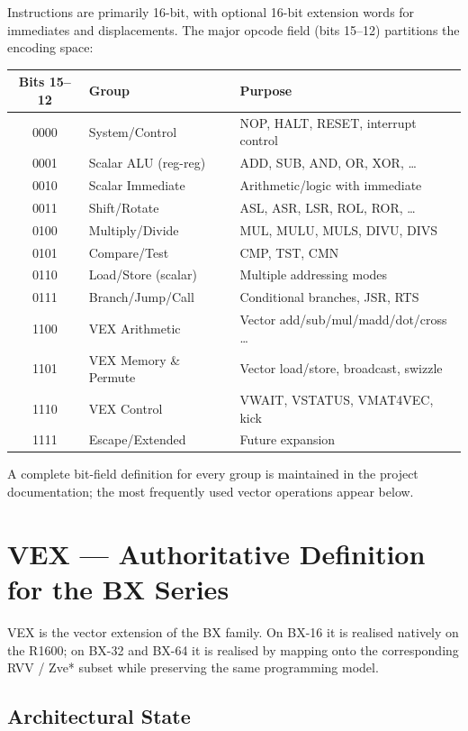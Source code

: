 \documentclass[11pt,a4paper]{article}
\begin{document}
Instructions are primarily 16-bit, with optional 16-bit extension words for immediates and displacements. The major opcode field (bits 15--12) partitions the encoding space:

\begin{center}
\begin{tabular}{@{}clp{7cm}@{}}
\toprule
Bits 15--12 & Group & Purpose \\
\midrule
0000 & System/Control & NOP, HALT, RESET, interrupt control \\
0001 & Scalar ALU (reg-reg) & ADD, SUB, AND, OR, XOR, \ldots \\
0010 & Scalar Immediate & Arithmetic/logic with immediate \\
0011 & Shift/Rotate & ASL, ASR, LSR, ROL, ROR, \ldots \\
0100 & Multiply/Divide & MUL, MULU, MULS, DIVU, DIVS \\
0101 & Compare/Test & CMP, TST, CMN \\
0110 & Load/Store (scalar) & Multiple addressing modes \\
0111 & Branch/Jump/Call & Conditional branches, JSR, RTS \\
1100 & VEX Arithmetic & Vector add/sub/mul/madd/dot/cross \ldots \\
1101 & VEX Memory \& Permute & Vector load/store, broadcast, swizzle \\
1110 & VEX Control & VWAIT, VSTATUS, VMAT4VEC, kick \\
1111 & Escape/Extended & Future expansion \\
\bottomrule
\end{tabular}
\end{center}

A complete bit-field definition for every group is maintained in the project documentation; the most frequently used vector operations appear below.

\section{VEX --- Authoritative Definition for the BX Series}

VEX is the vector extension of the BX family. On BX-16 it is realised natively on the R1600; on BX-32 and BX-64 it is realised by mapping onto the corresponding RVV / Zve* subset while preserving the same programming model.

\subsection{Architectural State}
\end{document}
